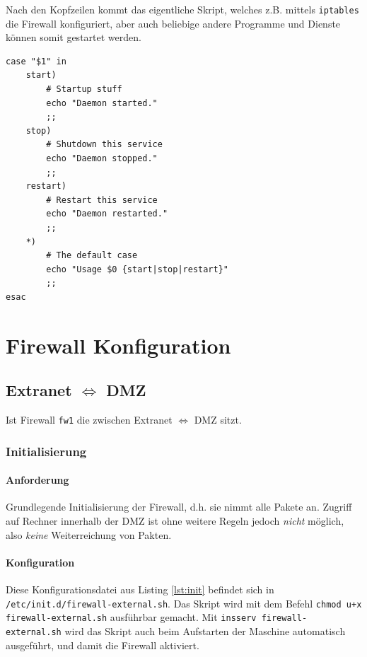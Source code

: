 Nach den Kopfzeilen kommt das eigentliche Skript, welches z.B. mittels
{\tt iptables} die Firewall konfiguriert, aber auch beliebige andere Programme
und Dienste können somit gestartet werden.

\begin{lstlisting}[label=lst:lsb-script,caption={Init Script LSB: Eigentliches Skript.}]
case "$1" in
    start)
        # Startup stuff
        echo "Daemon started."
        ;;
    stop)
        # Shutdown this service
        echo "Daemon stopped."
        ;;
    restart)
        # Restart this service
        echo "Daemon restarted."
        ;;
    *)
        # The default case
        echo "Usage $0 {start|stop|restart}"
        ;;
esac
\end{lstlisting}



\section{Firewall Konfiguration}

\subsection{Extranet $\Longleftrightarrow$ DMZ}

Ist Firewall {\tt fw1} die zwischen Extranet $\Longleftrightarrow$ DMZ sitzt.


\subsubsection{Initialisierung}

\paragraph{Anforderung} Grundlegende Initialisierung der Firewall, d.h.
sie nimmt alle Pakete an. Zugriff auf Rechner innerhalb der DMZ ist ohne
weitere Regeln jedoch \emph{nicht} möglich, also \emph{keine} Weiterreichung von
Pakten.

\paragraph{Konfiguration} Diese Konfigurationsdatei aus Listing \ref{lst:init}
befindet sich in {\tt /etc/init.d/firewall-external.sh}.
Das Skript wird mit dem Befehl {\tt chmod u+x firewall-external.sh}
ausführbar gemacht. Mit {\tt insserv firewall-external.sh}
wird das Skript auch beim Aufstarten der Maschine automatisch ausgeführt,
und damit die Firewall aktiviert.


